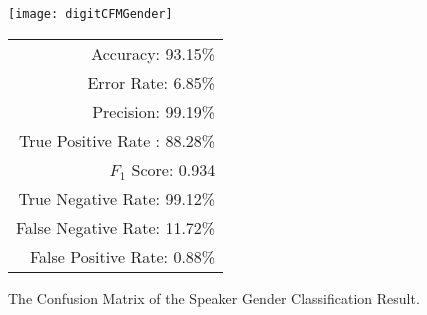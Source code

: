 \begin{figure}[!h]
	\begin{minipage}{\linewidth}
			\centering
		\begin{minipage}[c]{0.35\linewidth}
			
			\texttt{[image: digitCFMGender]}
		\end{minipage}
		\begin{minipage}[b]{0.49\linewidth}
			 \centering
				\begin{tabular}{r}
				\toprule
				Accuracy: 93.15\% \\ Error Rate: 6.85\% \\
				Precision: 99.19\% \\True Positive Rate : 88.28\% \\
				$F_1$ Score: 0.934 \\ True Negative Rate: 99.12\% \\
				False Negative Rate: 11.72\%  \\ False Positive Rate: 0.88\% \\
				\bottomrule
			\end{tabular}
		\end{minipage}
	\end{minipage}
\caption{The Confusion Matrix of the Speaker Gender Classification Result. 
		}
	\label{fig:genderCFM}
\end{figure}
